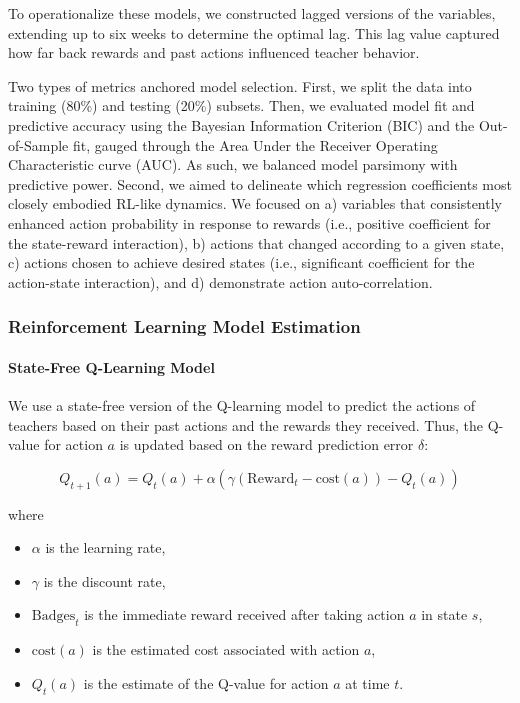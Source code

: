 \documentclass[
  number,
  preprint,
  3p,
  onecolumn]{elsarticle}
\let\oldparagraph\paragraph
\renewcommand{\paragraph}[1]{\oldparagraph{#1}\mbox{}}
\providecommand{\tightlist}{%
  \setlength{\itemsep}{0pt}\setlength{\parskip}{0pt}}\usepackage{longtable,booktabs,array}
\begin{document}
To operationalize these models, we constructed lagged versions of the
variables, extending up to six weeks to determine the optimal lag. This
lag value captured how far back rewards and past actions influenced
teacher behavior.

Two types of metrics anchored model selection. First, we split the data
into training (80\%) and testing (20\%) subsets. Then, we evaluated
model fit and predictive accuracy using the Bayesian Information
Criterion (BIC) and the Out-of-Sample fit, gauged through the Area Under
the Receiver Operating Characteristic curve (AUC). As such, we balanced
model parsimony with predictive power. Second, we aimed to delineate
which regression coefficients most closely embodied RL-like dynamics. We
focused on a) variables that consistently enhanced action probability in
response to rewards (i.e., positive coefficient for the state-reward
interaction), b) actions that changed according to a given state, c)
actions chosen to achieve desired states (i.e., significant coefficient
for the action-state interaction), and d) demonstrate action
auto-correlation.

\subsubsection{Reinforcement Learning Model
Estimation}\label{reinforcement-learning-model-estimation}

\paragraph{State-Free Q-Learning
Model}\label{state-free-q-learning-model}

We use a state-free version of the Q-learning model to predict the
actions of teachers based on their past actions and the rewards they
received. Thus, the Q-value for action \(a\) is updated based on the
reward prediction error \(\delta\):

\[
Q_{t+1}(a) = Q_{t}(a) + \alpha \left( \gamma (\text{Reward}_t - \text{cost}(a)) - Q_{t}(a) \right)
\]

where

\begin{itemize}
\tightlist
\item
  \(\alpha\) is the learning rate,
\item
  \(\gamma\) is the discount rate,
\item
  \(\text{Badges}_t\) is the immediate reward received after taking
  action \(a\) in state \(s\),
\item
  \(\text{cost}(a)\) is the estimated cost associated with action \(a\),
\item
  \(Q_{t}(a)\) is the estimate of the Q-value for action \(a\) at time
  \(t\).
\end{itemize}
\end{document}
